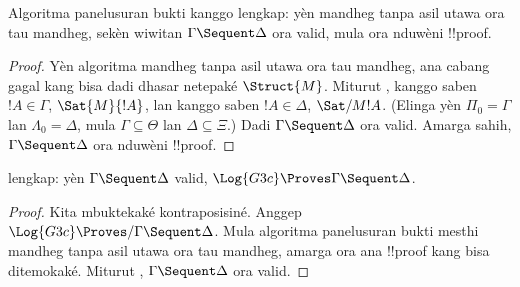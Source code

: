 \documentclass[../../../include/open-logic-section]{subfiles}
\begin{document}
\begin{cor} Algoritma panelusuran bukti
kanggo  lengkap: yèn mandheg tanpa asil utawa
ora tau mandheg, sekèn wiwitan
$\Gamma \Sequent \Delta$ ora valid, mula ora nduwèni
!!{proof}.
\end{cor}

\begin{proof}
  Yèn algoritma mandheg tanpa asil utawa ora tau mandheg,
  ana cabang gagal kang bisa dadi dhasar netepaké
  $\Struct{M}$. Miturut , kanggo
  saben $!A \in \Gamma$, $\Sat{M}{!A}$, lan kanggo
  saben $!A \in \Delta$, $\Sat/{M}{!A}$.
  (Elinga yèn $\Pi_0 = \Gamma$ lan $\Lambda_0 =
  \Delta$, mula $\Gamma \subseteq \Theta$ lan
  $\Delta \subseteq \Xi$.) Dadi
  $\Gamma \Sequent \Delta$ ora valid. Amarga
   sahih, $\Gamma \Sequent \Delta$
  ora nduwèni !!{proof}.
\end{proof}

\begin{cor}
 lengkap: yèn $\Gamma \Sequent \Delta$ valid,
$\Log{G3c} \Proves \Gamma \Sequent \Delta$.
\end{cor}

\begin{proof}
  Kita mbuktekaké kontraposisiné. Anggep
  $\Log{G3c} \Proves/ \Gamma \Sequent \Delta$.
  Mula algoritma panelusuran bukti mesthi mandheg tanpa
  asil utawa ora tau mandheg, amarga ora ana !!{proof}
  kang bisa ditemokaké. Miturut ,
  $\Gamma \Sequent \Delta$ ora valid.
\end{proof}
\end{document}
